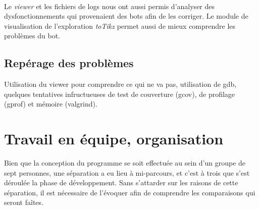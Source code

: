 \documentclass[a4paper,12pt]{article}
\begin{document}
\paragraph{}
Le {\em viewer} et les fichiers de logs nous ont aussi permis d'analyser des
dysfonctionnements qui provenaient des bots afin de les corriger. Le module de
visualisation de l'exploration {\em toTikz} permet aussi de mieux comprendre les
problèmes du bot.

\subsection*{Repérage des problèmes}
Utilisation du viewer pour comprendre ce qui ne va pas, utilisation de gdb,
quelques tentatives infructueuses de test de couverture (gcov), de profilage
(gprof) et mémoire (valgrind).

\section{Travail en équipe, organisation}

Bien que la conception du programme se soit effectuée au sein d'un groupe
de sept personnes, une séparation a eu lieu à mi-parcours, et c'est à trois que
s'est déroulée la phase de développement. Sans s'attarder sur les raisons de
cette séparation, il est nécessaire de l'évoquer afin de comprendre les
comparaisons qui seront faîtes.
\end{document}
